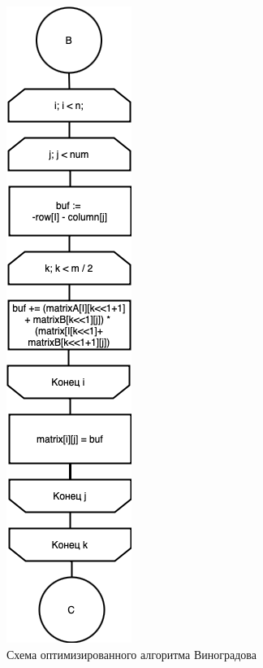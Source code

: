 \begin{figure}[h]
    \centering
    \includegraphics[width=0.3\linewidth]{img/WinogradOptC.jpg}
    \caption{Схема оптимизированного алгоритма Виноградова}
    \label{fig:mpr}
\end{figure}

